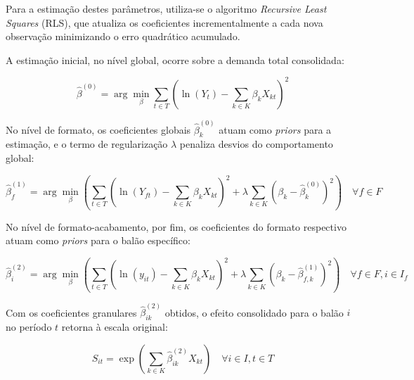 \documentclass[fleqn,12pt,a4paper]{article}
\begin{document}
Para a estimação destes parâmetros, utiliza-se o algoritmo \textit{Recursive Least Squares} (RLS), que atualiza os coeficientes incrementalmente a cada nova observação minimizando o erro quadrático acumulado.

A estimação inicial, no nível global, ocorre sobre a demanda total consolidada:
\begin{ceqn}
\begin{equation}
\hat{\beta}^{(0)} = \arg\min_{\beta} \sum_{t \in T} \left( \ln(Y_t) - \sum_{k \in K} \beta_{k} X_{kt} \right)^2
\label{eq:demanda_nivel0}
\end{equation}
\end{ceqn}

No nível de formato, os coeficientes globais $\hat{\beta}^{(0)}_k$ atuam como \textit{priors} para a estimação, e o termo de regularização $\lambda$ penaliza desvios do comportamento global:
\begin{ceqn}
\begin{equation}
\hat{\beta}^{(1)}_{f} = \arg\min_{\beta} \left( \sum_{t \in T} \left( \ln(Y_{ft}) - \sum_{k \in K} \beta_{k} X_{kt} \right)^2 + \lambda \sum_{k \in K} \left( \beta_{k} - \hat{\beta}^{(0)}_k \right)^2 \right) \quad \forall f \in F
\label{eq:demanda_nivel1}
\end{equation}
\end{ceqn}

No nível de formato-acabamento, por fim, os coeficientes do formato respectivo atuam como \textit{priors} para o balão específico:
\begin{ceqn}
\begin{equation}
\hat{\beta}^{(2)}_{i} = \arg\min_{\beta} \left( \sum_{t \in T} \left( \ln(y_{it}) - \sum_{k \in K} \beta_{k} X_{kt} \right)^2 + \lambda \sum_{k \in K} \left( \beta_{k} - \hat{\beta}^{(1)}_{f,k} \right)^2 \right) \quad \forall f \in F, i \in I_f
\label{eq:demanda_nivel2}
\end{equation}
\end{ceqn}

Com os coeficientes granulares $\hat{\beta}^{(2)}_{ik}$ obtidos, o efeito consolidado para o balão $i$ no período $t$ retorna à escala original:
\begin{ceqn}
\begin{equation}
S_{it} = \exp \left( \sum_{k \in K} \hat{\beta}^{(2)}_{ik} X_{kt} \right) \quad \forall i \in I, t \in T
\label{eq:efeito_consolidado}
\end{equation}
\end{ceqn}
\end{document}
